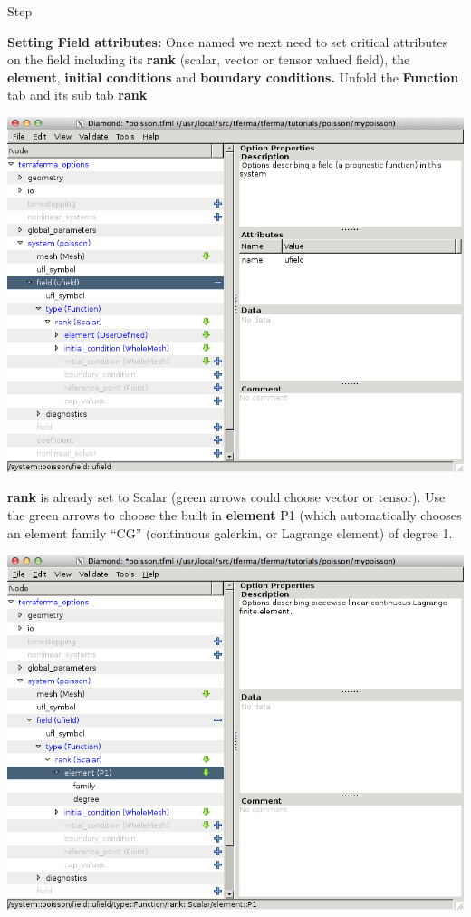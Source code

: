 \begin{steps}{Step}
\begin{center}
\end{center}
\item \textbf{Setting Field attributes:} Once named we next need to
  set critical attributes on the field including its \textbf{rank}
  (scalar, vector or tensor valued field), the \textbf{element},
  \textbf{initial conditions} and \textbf{boundary conditions.} Unfold
  the \textbf{Function} tab and its sub tab \textbf{rank}
\begin{center}
    \includegraphics[width=\diamondwidth]{figures/screendumps/diamond_poisson_07a.png}
\end{center}
\textbf{rank} is already set to Scalar (green arrows could choose
vector or tensor). Use the green arrows to choose the built in
\textbf{element} P1 (which automatically chooses an element family
``CG'' (continuous galerkin, or Lagrange element) of degree 1.
\begin{center}
    \includegraphics[width=\diamondwidth]{figures/screendumps/diamond_poisson_07b.png}

\end{center}
\end{steps}
